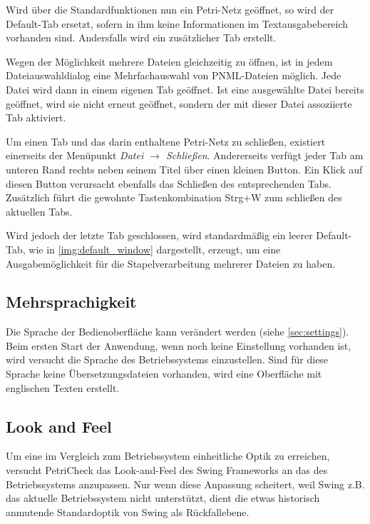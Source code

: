 Wird über die Standardfunktionen nun ein Petri-Netz geöffnet, so wird der
Default-Tab ersetzt, sofern in ihm keine Informationen im Textausgabebereich
vorhanden sind. Andersfalls wird ein zusätzlicher Tab erstellt.

Wegen der Möglichkeit mehrere Dateien gleichzeitig zu öffnen, ist in jedem
Dateiauswahldialog eine Mehrfachauswahl von PNML-Dateien möglich. Jede Datei
wird dann in einem eigenen Tab geöffnet. Ist eine ausgewählte Datei bereits
geöffnet, wird sie nicht erneut geöffnet, sondern der mit dieser Datei
assoziierte Tab aktiviert.

Um einen Tab und das darin enthaltene Petri-Netz zu schließen, existiert
einerseits der Menüpunkt \emph{Datei $\rightarrow$ Schließen}. Andererseits
verfügt jeder Tab am unteren Rand rechts neben seinem Titel über einen kleinen
Button. Ein Klick auf diesen Button verursacht ebenfalls das Schließen des
entsprechenden Tabs. Zusätzlich führt die gewohnte Tastenkombination Strg+W zum
schließen des aktuellen Tabs.

Wird jedoch der letzte Tab geschlossen, wird
standardmäßig ein leerer Default-Tab, wie in \cref{img:default_window}
dargestellt, erzeugt, um eine Ausgabemöglichkeit für die Stapelverarbeitung
mehrerer Dateien zu haben.

\subsection{Mehrsprachigkeit}
Die Sprache der Bedienoberfläche kann verändert werden (siehe
\cref{sec:settings}). Beim ersten Start der Anwendung, wenn noch keine
Einstellung vorhanden ist, wird versucht die Sprache des Betriebssystems
einzustellen. Sind für diese Sprache keine Übersetzungsdateien vorhanden, wird
eine Oberfläche mit englischen Texten erstellt.

\subsection{Look and Feel}
Um eine im Vergleich zum Betriebssystem einheitliche Optik zu erreichen,
versucht PetriCheck das Look-and-Feel des Swing Frameworks an das des
Betriebssystems anzupassen. Nur wenn diese Anpassung scheitert, weil Swing z.B.
das aktuelle Betriebssystem nicht unterstützt, dient die etwas historisch
anmutende Standardoptik von Swing als Rück\-fall\-ebene.

